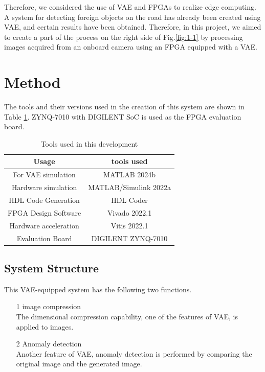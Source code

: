 \documentclass[conference]{IEEEtran}
\begin{document}
Therefore, we considered the use of VAE and FPGAs to realize edge computing.
A system for detecting foreign objects on the road has already been created using VAE, and certain results have been obtained\cite{vae-road}. %
Therefore, in this project, we aimed to create a part of the process on the right side of Fig.\ref{fig:1-1} by processing images acquired from an onboard camera using an FPGA equipped with a VAE.

\section{Method}
The tools and their versions used in the creation of this system are shown in Table \ref{tb:1}.
ZYNQ-7010 with DIGILENT SoC is used as the FPGA evaluation board.
\begin{table}[tb]
    \centering
    \caption{Tools used in this development}
    \small
    \begin{tabular}{|c|c|} \hline
      Usage & tools used \\ \hline \hline
      For VAE simulation & MATLAB 2024b \\ \hline
      Hardware simulation & MATLAB/Simulink 2022a \\\hline
      HDL Code Generation & HDL Coder \\\hline
      FPGA Design Software & Vivado 2022.1 \\ \hline
      Hardware acceleration & Vitis 2022.1 \\\hline
      Evaluation Board & DIGILENT ZYNQ-7010 \\\hline
    \end{tabular}
    \label{tb:1}
\end{table}

\subsection{System Structure}
This VAE-equipped system has the following two functions.
\begin{itemize}
  \item[1] image compression\\
  The dimensional compression capability, one of the features of VAE, is applied to images.
  \item[2] Anomaly detection\\
  Another feature of VAE, anomaly detection is performed by comparing the original image and the generated image.  
\end{itemize}
\end{document}
